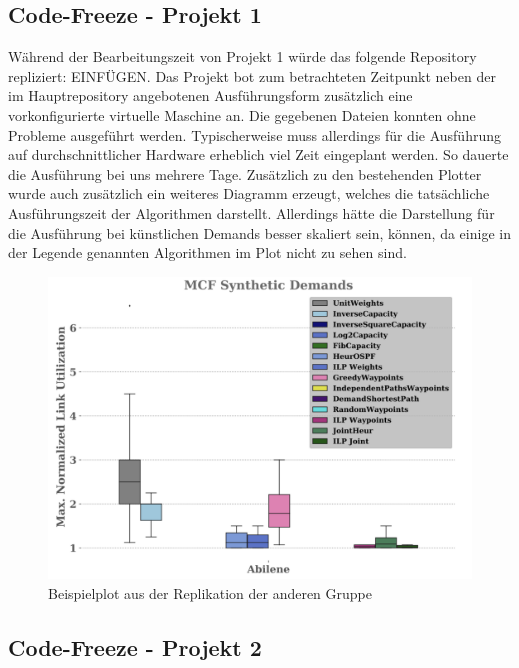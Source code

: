 \documentclass[sigconf]{acmart}
\begin{document}
\subsection{Code-Freeze - Projekt 1}
Während der Bearbeitungszeit von Projekt 1 würde das folgende Repository repliziert: EINFÜGEN.
Das Projekt bot zum betrachteten Zeitpunkt neben der im Hauptrepository angebotenen Ausführungsform zusätzlich eine vorkonfigurierte virtuelle Maschine an.
Die gegebenen Dateien konnten ohne Probleme ausgeführt werden. Typischerweise muss allerdings für die Ausführung auf durchschnittlicher Hardware erheblich viel Zeit eingeplant werden.
So dauerte die Ausführung bei uns mehrere Tage. Zusätzlich zu den bestehenden Plotter wurde auch zusätzlich ein weiteres Diagramm erzeugt, welches die tatsächliche Ausführungszeit der Algorithmen darstellt. Allerdings hätte die Darstellung für die Ausführung bei künstlichen Demands besser skaliert sein, können, da einige in der Legende genannten Algorithmen im Plot nicht zu sehen sind. 
\begin{figure}[h]
  \centering
  \includegraphics[width=\linewidth]{abbildungen/replik1}
  \caption{Beispielplot aus der Replikation der anderen Gruppe}
\end{figure}
\subsection{Code-Freeze - Projekt 2}








\end{document}
